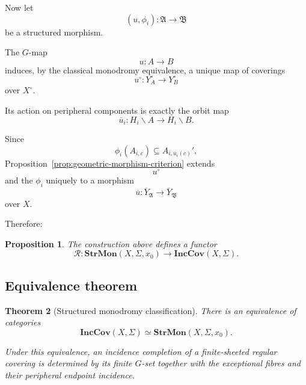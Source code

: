 \documentclass[11pt]{article}
\theoremstyle{plain}
\newtheorem{theorem}{Theorem}[section]
\newtheorem{proposition}[theorem]{Proposition}
\theoremstyle{definition}
\begin{document}
Now let
\[
(u,\phi_i):
\mathfrak A\to\mathfrak B
\]
be a structured morphism.

The $G$-map
\[
u:A\to B
\]
induces, by the classical monodromy equivalence, a unique map of
coverings
\[
u^\circ:
Y_A^\circ\to Y_B^\circ
\]
over $X^\circ$.

Its action on peripheral components is exactly the orbit map
\[
\overline u_i:
H_i\backslash A
\to
H_i\backslash B.
\]

Since
\[
\phi_i(A_{i,c})
\subseteq
A_{i,\overline u_i(c)}',
\]
Proposition~\ref{prop:geometric-morphism-criterion} extends
\[
u^\circ
\]
and the $\phi_i$ uniquely to a morphism
\[
\overline u:
\overline Y_{\mathfrak A}
\to
\overline Y_{\mathfrak B}
\]
over $X$.

Therefore:

\begin{proposition}
\label{prop:reconstruction-functor}
The construction above defines a functor
\[
\mathscr R:
\mathbf{StrMon}(X,\Sigma,x_0)
\longrightarrow
\mathbf{IncCov}(X,\Sigma).
\]
\end{proposition}

\subsection{Equivalence theorem}
\label{subsec:structured-equivalence}

\begin{theorem}[Structured monodromy classification]
\label{thm:structured-monodromy-equivalence}
There is an equivalence of categories
\[
\mathbf{IncCov}(X,\Sigma)
\simeq
\mathbf{StrMon}(X,\Sigma,x_0).
\]

Under this equivalence, an incidence completion of a finite-sheeted regular covering is
determined by its finite $G$-set together with the exceptional fibres and their peripheral
endpoint incidence.
\end{theorem}
\end{document}
